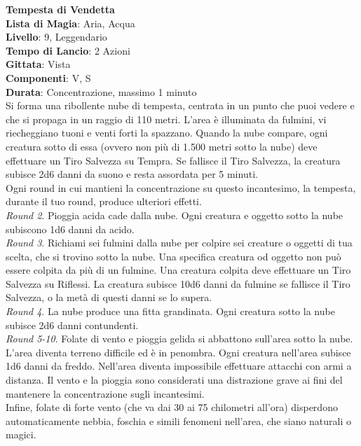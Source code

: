 \documentclass[a4paper,twoside,openany]{book}
\begin{document}
\begin{multicols}{2}
\medskip\textbf{Tempesta di Vendetta}\\
\textbf{Lista di Magia}: Aria, Acqua\\
\textbf{Livello}: 9, Leggendario\\
\textbf{Tempo di Lancio}: 2 Azioni\\
\textbf{Gittata}: Vista\\
\textbf{Componenti}: V, S\\
\textbf{Durata}: Concentrazione, massimo 1 minuto\\
Si forma una ribollente nube di tempesta, centrata in un punto che puoi vedere e che si propaga in un raggio di 110 metri. L'area è illuminata da fulmini, vi riecheggiano tuoni e venti forti la spazzano. Quando la nube compare, ogni creatura sotto di essa (ovvero non più di 1.500 metri sotto la nube) deve effettuare un Tiro Salvezza su Tempra. Se fallisce il Tiro Salvezza, la creatura subisce 2d6 danni da suono e resta assordata per 5 minuti.\\
Ogni round in cui mantieni la concentrazione su questo incantesimo, la tempesta, durante il tuo round, produce ulteriori effetti.\\
\emph{Round 2}. Pioggia acida cade dalla nube. Ogni creatura e oggetto sotto la nube subiscono 1d6 danni da acido.\\
\emph{Round 3}. Richiami sei fulmini dalla nube per colpire sei creature o oggetti di tua scelta, che si trovino sotto la nube. Una specifica creatura od oggetto non può essere colpita da più di un fulmine. Una creatura colpita deve effettuare un Tiro Salvezza su Riflessi. La creatura subisce 10d6 danni da fulmine se fallisce il Tiro Salvezza, o la metà di questi danni se lo supera. \\
\emph{Round 4}. La nube produce una fitta grandinata. Ogni creatura sotto la nube subisce 2d6 danni contundenti.\\
\emph{Round 5-10}. Folate di vento e pioggia gelida si abbattono sull'area sotto la nube. L'area diventa terreno difficile ed è in penombra. Ogni creatura nell'area subisce 1d6 danni da freddo. Nell'area diventa impossibile effettuare attacchi con armi a distanza. Il vento e la pioggia sono considerati una distrazione grave ai fini del mantenere la concentrazione sugli incantesimi.\\ Infine, folate di forte vento (che va dai 30 ai 75 chilometri all'ora) disperdono automaticamente nebbia, foschia e simili fenomeni nell'area, che siano naturali o magici.



\end{multicols}
\end{document}
